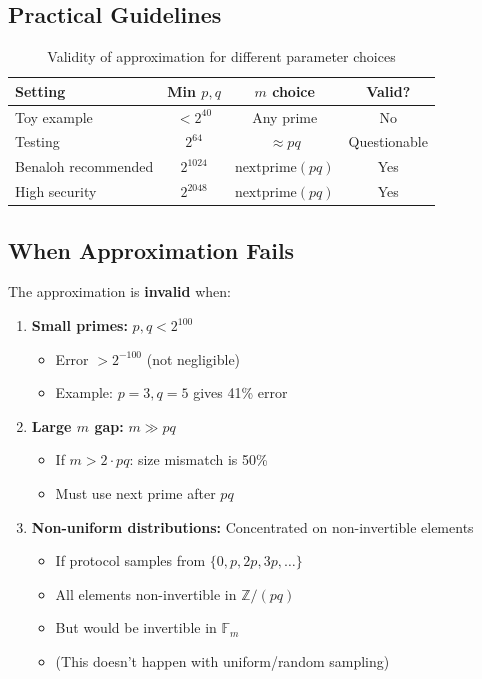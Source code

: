 \documentclass[11pt]{article}
\theoremstyle{definition}
\begin{document}
\subsection{Practical Guidelines}

\begin{table}[h]
\centering
\begin{tabular}{@{}lccc@{}}
\toprule
\textbf{Setting} & \textbf{Min $p,q$} & \textbf{$m$ choice} & \textbf{Valid?} \\ 
\midrule
Toy example & $< 2^{40}$ & Any prime & No \\
Testing & $2^{64}$ & $\approx pq$ & Questionable \\
Benaloh recommended & $2^{1024}$ & $\text{nextprime}(pq)$ & Yes \\
High security & $2^{2048}$ & $\text{nextprime}(pq)$ & Yes \\
\bottomrule
\end{tabular}
\caption{Validity of approximation for different parameter choices}
\end{table}

\subsection{When Approximation Fails}

The approximation is \textbf{invalid} when:
\begin{enumerate}
\item \textbf{Small primes:} $p,q < 2^{100}$ 
  \begin{itemize}
  \item Error $> 2^{-100}$ (not negligible)
  \item Example: $p=3, q=5$ gives 41\% error
  \end{itemize}

\item \textbf{Large $m$ gap:} $m \gg pq$
  \begin{itemize}
  \item If $m > 2 \cdot pq$: size mismatch is 50\%
  \item Must use next prime after $pq$
  \end{itemize}

\item \textbf{Non-uniform distributions:} Concentrated on non-invertible elements
  \begin{itemize}
  \item If protocol samples from $\{0, p, 2p, 3p, \ldots\}$
  \item All elements non-invertible in $\mathbb{Z}/(pq)$
  \item But would be invertible in $\mathbb{F}_m$
  \item (This doesn't happen with uniform/random sampling)
  \end{itemize}
\end{enumerate}
\end{document}
